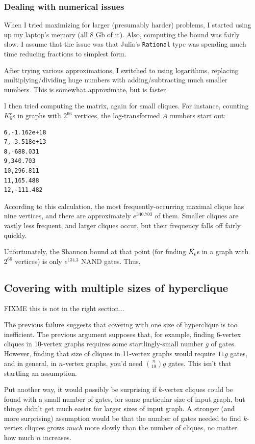 \documentclass[12pt]{article}
\theoremstyle{definition}
\begin{document}
\subsubsection{Dealing with numerical issues}

When I tried maximizing for larger (presumably harder)
problems, I started using up my laptop's
memory (all 8 Gb of it). Also, computing the bound
was fairly slow. I assume that the
issue was that Julia's {\tt Rational} type was spending much time reducing
fractions to simplest form.

After trying various approximations, I switched to using
logarithms, replacing multiplying/dividing
huge numbers with adding/subtracting much smaller numbers.
This is somewhat approximate, but is faster.

I then tried computing the matrix, again for small cliques.
For instance, counting $K_6^r$s in graphs with
$2^66$ vertices, the log-transformed $A$ numbers start out:

\begin{verbatim}
6,-1.162e+18
7,-3.518e+13
8,-688.031
9,340.703
10,296.811
11,165.488
12,-111.482
\end{verbatim}

According to this calculation, the most frequently-occurring
maximal clique has nine vertices, and there are
approximately $e^{340.703}$ of them. Smaller cliques are
vastly less frequent, and larger cliques occur, but their
frequency falls off fairly quickly.

Unfortunately, the Shannon bound at that point (for
finding $K_6$s in a graph with $2^66$ vertices)
is only $e^{134.3}$ NAND gates. Thus, 

\subsection{Covering with multiple sizes of hyperclique}

FIXME this is not in the right section...

The previous failure suggests that covering
with one size of hyperclique is too inefficient. The previous
argument supposes that, for example, finding 6-vertex cliques
in 10-vertex graphs requires some startlingly-small number $g$ of
gates. However, finding that size of cliques in 11-vertex graphs
would require $11g$ gates, and in general, in $n$-vertex graphs,
you'd need ${n \choose 10}g$ gates.
This isn't that startling an assumption.

Put another way, it would possibly be surprising if $k$-vertex
cliques could be found with a small number of gates, for some particular
size of input graph, but things didn't get much easier for
larger sizes of input graph.
A stronger (and more surprising) assumption would be that the
number of gates needed to find $k$-vertex cliques grows {\em much} more
slowly than the number of cliques, no matter how much $n$ increases.
\end{document}
